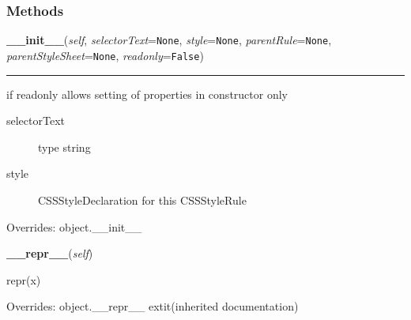 
  \subsubsection{Methods}

    \vspace{0.5ex}

\hspace{.8\funcindent}\begin{boxedminipage}{\funcwidth}

    \raggedright \textbf{\_\_init\_\_}(\textit{self}, \textit{selectorText}={\tt None}, \textit{style}={\tt None}, \textit{parentRule}={\tt None}, \textit{parentStyleSheet}={\tt None}, \textit{readonly}={\tt False})

    \vspace{-1.5ex}

    \rule{\textwidth}{0.5\fboxrule}
\setlength{\parskip}{2ex}

if readonly allows setting of properties in constructor only
\begin{description}
\item[{selectorText}] \leavevmode 
type string

\item[{style}] \leavevmode 
CSSStyleDeclaration for this CSSStyleRule

\end{description}
\setlength{\parskip}{1ex}
      Overrides: object.\_\_init\_\_

    \end{boxedminipage}

    \vspace{0.5ex}

\hspace{.8\funcindent}\begin{boxedminipage}{\funcwidth}

    \raggedright \textbf{\_\_repr\_\_}(\textit{self})

\setlength{\parskip}{2ex}
    repr(x)

\setlength{\parskip}{1ex}
      Overrides: object.\_\_repr\_\_ 	extit{(inherited documentation)}

    \end{boxedminipage}

    \vspace{0.5ex}

